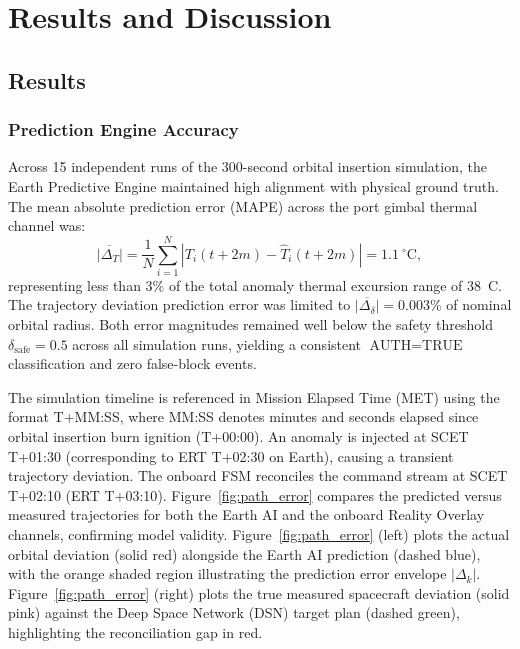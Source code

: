 \documentclass[ASNA,twocolumn]{USG}
\begin{document}
\section{Results and Discussion}

\subsection{Results}
\subsubsection{Prediction Engine Accuracy}
Across 15 independent runs of the 300-second orbital insertion simulation, the Earth Predictive Engine
maintained high alignment with physical ground truth. The mean absolute prediction error (MAPE) across
the port gimbal thermal channel was:
\begin{equation}
  \overline{|\Delta_T|} = \frac{1}{N}\sum_{i=1}^{N}|T_i(t+2m) - \hat{T}_i(t+2m)| = 1.1~^\circ\text{C},
\end{equation}
representing less than 3\% of the total anomaly thermal excursion range of 38~\textdegree C.
The trajectory deviation prediction error was limited to \(\overline{|\Delta_\delta|} = 0.003\%\)
of nominal orbital radius. Both error magnitudes remained well below the safety threshold
\(\delta_\text{safe} = 0.5\) across all simulation runs, yielding a consistent
\(\text{AUTH} = \text{TRUE}\) classification and zero false-block events.

The simulation timeline is referenced in Mission Elapsed Time (MET) using the format \textsc{T+MM:SS}, where MM:SS denotes minutes and seconds elapsed since orbital insertion burn ignition (\textsc{T+00:00}). An anomaly is injected at SCET \textsc{T+01:30} (corresponding to ERT \textsc{T+02:30} on Earth), causing a transient trajectory deviation. The onboard FSM reconciles the command stream at SCET \textsc{T+02:10} (ERT \textsc{T+03:10}). Figure~\ref{fig:path_error} compares the predicted versus measured trajectories for both the Earth AI and the onboard Reality Overlay channels, confirming model validity. Figure~\ref{fig:path_error} (left) plots the actual orbital deviation (solid red) alongside the Earth AI prediction (dashed blue), with the orange shaded region illustrating the prediction error envelope \(|\Delta_k|\). Figure~\ref{fig:path_error} (right) plots the true measured spacecraft deviation (solid pink) against the Deep Space Network (DSN) target plan (dashed green), highlighting the reconciliation gap in red.
\end{document}
